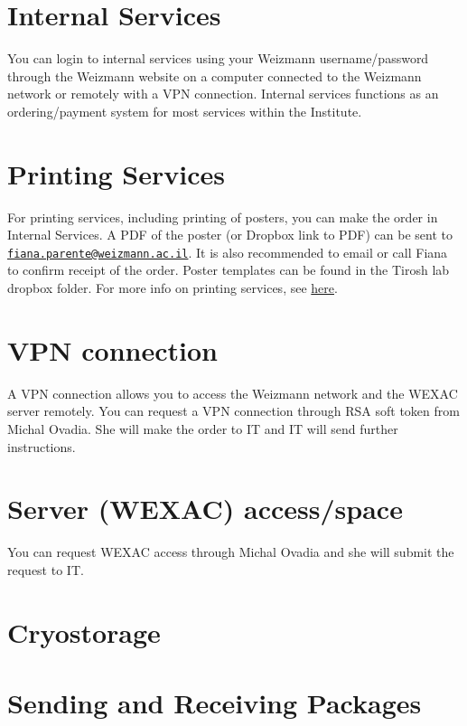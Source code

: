\documentclass[]{book}
\begin{document}
\section{Internal Services}\label{internal-services}

You can login to internal services using your Weizmann username/password
through the Weizmann website on a computer connected to the Weizmann
network or remotely with a VPN connection. Internal services functions
as an ordering/payment system for most services within the Institute.

\section{Printing Services}\label{printing-services}

For printing services, including printing of posters, you can make the
order in Internal Services. A PDF of the poster (or Dropbox link to PDF)
can be sent to
\href{mailto:fiana.parente@weizmann.ac.il}{\nolinkurl{fiana.parente@weizmann.ac.il}}.
It is also recommended to email or call Fiana to confirm receipt of the
order. Poster templates can be found in the Tirosh lab dropbox folder.
For more info on printing services, see
\href{https://www.weizmann.ac.il/RSD/units/design-photography-printing-branch/overview}{here}.

\section{VPN connection}\label{vpn-connection}

A VPN connection allows you to access the Weizmann network and the WEXAC
server remotely. You can request a VPN connection through RSA soft token
from Michal Ovadia. She will make the order to IT and IT will send
further instructions.

\section{Server (WEXAC) access/space}\label{server-wexac-accessspace}

You can request WEXAC access through Michal Ovadia and she will submit
the request to IT.

\section{Cryostorage}\label{cryostorage}

\section{Sending and Receiving
Packages}\label{sending-and-receiving-packages}
\end{document}
